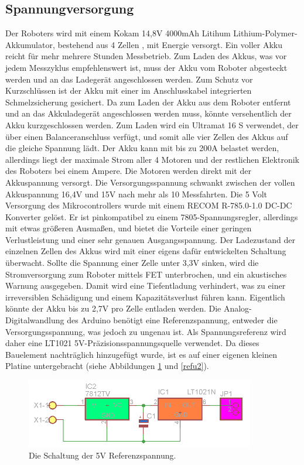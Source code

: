\documentclass[a4paper,bibtotoc,oneside]{scrbook}
\begin{document}
\subsection{Spannungversorgung}\thispagestyle{empty}
Der Roboters wird mit einem Kokam 14,8V 4000mAh Litihum Lithium-Polymer-Akkumulator, bestehend aus 4 Zellen \cite{kokam}, mit Energie versorgt. Ein voller Akku reicht für mehr mehrere Stunden Messbetrieb. Zum Laden des Akkus, was vor jedem Messzyklus empfehlenswert ist, muss der Akku vom Roboter abgesteckt werden und an das Ladegerät angeschlossen werden. Zum Schutz vor Kurzschlüssen ist der Akku mit einer im Anschlusskabel integrierten Schmelzsicherung gesichert. Da zum Laden der Akku aus dem Roboter entfernt und an das Akkuladegerät angeschlossen werden muss, könnte versehentlich der Akku kurzgeschlossen werden. Zum Laden wird ein Ultramat 16 S verwendet, der über einen Balanceranschluss verfügt, und somit alle vier Zellen des Akkus auf die gleiche Spannung lädt. 
Der Akku kann mit bis zu 200A belastet werden, allerdings liegt der maximale Strom aller 4 Motoren und der restlichen Elektronik des Roboters bei einem Ampere. Die Motoren werden direkt mit der Akkuspannung versorgt. Die Versorgungsspannung schwankt zwischen der vollen Akkuspannung 16,4V und 15V nach mehr als 10 Messfahrten.
Die 5 Volt Versorgung des Mikrocontrollers wurde mit einem RECOM R-785.0-1.0 DC-DC Konverter \cite{ref5} gelöst. Er ist pinkompatibel zu einem 7805-Spannungsregler, allerdings mit etwas größeren Ausmaßen, und bietet die Vorteile einer geringen Verlustleistung und einer sehr genauen Ausgangsspannung. 
Der Ladezustand der einzelnen Zellen des Akkus wird mit einer eigens dafür entwickelten Schaltung überwacht. Sollte die Spannung einer Zelle unter 3,3V sinken, wird die Stromversorgung zum Roboter mittels FET unterbrochen, und ein akustisches Warnung ausgegeben. Damit wird eine Tiefentladung verhindert, was zu einer irreversiblen Schädigung und einem Kapazitätsverlust führen kann. Eigentlich könnte der Akku bis zu 2,7V pro Zelle entladen werden.
Die Analog-Digitalwandlung des Arduino benötigt eine Referenzspannung, entweder die Versorgungsspannung, was jedoch zu ungenau ist. Als Spannungsreferenz wird daher eine LT1021 5V-Präzisionsspannungsquelle \cite{lt1021} verwendet. Da dieses Bauelement nachträglich hinzugefügt wurde, ist es auf einer eigenen kleinen Platine untergebracht (siehe Abbildungen \ref{refu} und \ref{refu2}).

\begin{figure}[htbp]
\centering
\includegraphics[width=100mm]{img/refu.png}
\caption{Die Schaltung der 5V Referenzspannung.}\label{refu}
\end{figure}
\end{document}
